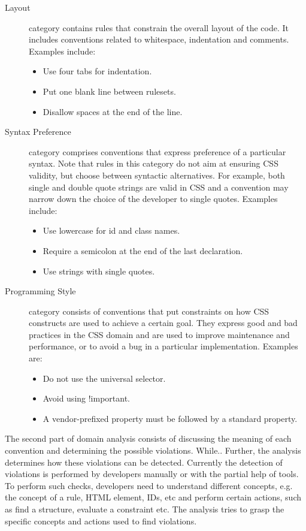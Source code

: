 \documentclass[parskip=full]{uvamscse}
\begin{document}
\begin{description}
  \item[Layout] category contains rules that constrain the overall layout of the code. It includes conventions related to whitespace, indentation and comments. Examples include:
  \begin{itemize}
  \item Use four tabs for indentation.
  \item Put one blank line between rulesets.
  \item Disallow spaces at the end of the line.
  \end{itemize}
  \item[Syntax Preference] category comprises conventions that express preference of a particular syntax. Note that rules in this category do not aim at ensuring CSS validity, but choose between syntactic alternatives. For example, both single and double quote strings are valid in CSS and a convention may narrow down the choice of the developer to single quotes. Examples include:
  \begin{itemize}
  \item Use lowercase for id and class names.
  \item Require a semicolon at the end of the last declaration.
  \item Use strings with single quotes.
  \end{itemize}
  \item[Programming Style] category consists of conventions that put constraints on how CSS constructs are used to achieve a certain goal. They express good and bad practices in the CSS domain and are used to improve maintenance and performance, or to avoid a bug in a particular implementation. Examples are:
  \begin{itemize}
  \item Do not use the universal selector.
  \item Avoid using !important.
  \item A vendor-prefixed property must be followed by a standard property.
  \end{itemize}
\end{description}

The second part of domain analysis consists of discussing the meaning of each convention and
determining the possible violations. While.. Further, the analysis determines how these violations
can be detected. Currently the detection of violations is performed by developers manually or
with the partial help of tools. To perform such checks, developers need to understand different concepts, e.g. the concept of a rule, HTML element, IDs, etc and perform certain actions, such as find a structure, evaluate a constraint etc. The analysis tries to grasp the specific concepts and actions used to find violations. 
\end{document}
